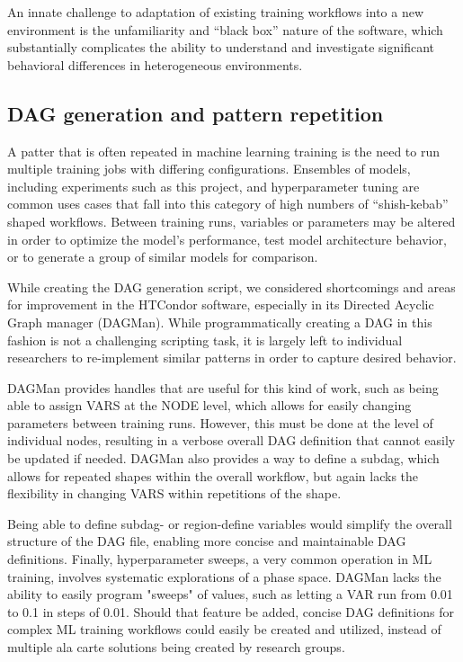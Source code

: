 \documentclass{article}
\begin{document}
An innate challenge to adaptation of existing training workflows into a new
environment is the unfamiliarity and ``black box'' nature of the software, which
substantially complicates the ability to understand and investigate significant
behavioral differences in heterogeneous environments.


\subsection{DAG generation and pattern repetition}
A patter that is often repeated in machine learning training is the need to run
multiple training jobs with differing configurations. Ensembles of models,
including experiments such as this project, and hyperparameter tuning are common
uses cases that fall into this category of high numbers of ``shish-kebab''
shaped workflows. Between training runs, variables or parameters may be altered
in order to optimize the model's performance, test model architecture behavior,
or to generate a group of similar models for comparison.

While creating the DAG generation script, we considered shortcomings and areas
for improvement in the HTCondor software, especially in its Directed Acyclic
Graph manager (DAGMan). While programmatically creating a DAG in this fashion is
not a challenging scripting task, it is largely left to individual researchers
to re-implement similar patterns in order to capture desired behavior.

DAGMan provides handles that are useful for this kind of work, such as being
able to assign VARS at the NODE level, which allows for easily changing parameters
between training runs. However, this must be done at the level of individual nodes, resulting
in a verbose overall DAG definition that cannot easily be updated if needed. DAGMan also
provides a way to define a subdag, which allows for repeated shapes within
the overall workflow, but again lacks the flexibility in changing VARS within repetitions
of the shape.

Being able to define subdag- or region-define variables would simplify the
overall structure of the DAG file, enabling more concise and maintainable DAG
definitions. Finally, hyperparameter sweeps, a very common operation in ML
training, involves systematic explorations of a phase space. DAGMan lacks the
ability to easily program "sweeps" of values, such as letting a VAR run from
0.01 to 0.1 in steps of 0.01. Should that feature be added, concise DAG definitions
for complex ML training workflows could easily be created and utilized, instead of
multiple ala carte solutions being created by research groups.
\end{document}
